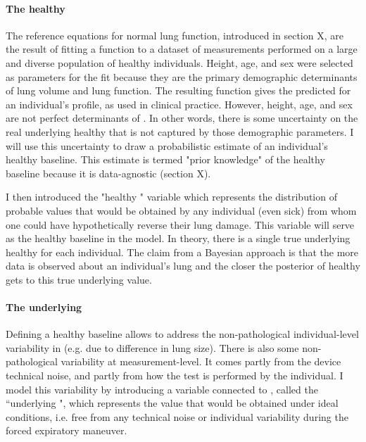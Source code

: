 \paragraph{The healthy \F}
The reference equations for normal lung function, introduced in section X, are the result of fitting a function to a dataset of \F measurements performed on a large and diverse population of healthy individuals. Height, age, and sex were selected as parameters for the fit because they are the primary demographic determinants of lung volume and lung function. The resulting function gives the predicted \F for an individual's profile, as used in clinical practice. However, height, age, and sex are not perfect determinants of \F. In other words, there is some uncertainty on the real underlying healthy \F that is not captured by those demographic parameters. I will use this uncertainty to draw a probabilistic estimate of an individual's healthy baseline. This estimate is termed "prior knowledge" of the healthy baseline because it is data-agnostic (section X).

I then introduced the "healthy \F" variable which represents the distribution of probable values that would be obtained by any individual (even sick) from whom one could have hypothetically reverse their lung damage. This variable will serve as the healthy baseline in the model. In theory, there is a single true underlying healthy \F for each individual. The claim from a Bayesian approach is that the more data is observed about an individual's lung and the closer the posterior of healthy \F gets to this true underlying value.


\paragraph{The underlying \F}
Defining a healthy baseline allows to address the non-pathological individual-level variability in \F (e.g. due to difference in lung size). There is also some non-pathological variability at measurement-level. It comes partly from the device technical noise, and partly from how the test is performed by the individual. I model this variability by introducing a variable connected to \F, called the “underlying \F", which represents the \F value that would be obtained under ideal conditions, i.e. free from any technical noise or individual variability during the forced expiratory maneuver.

